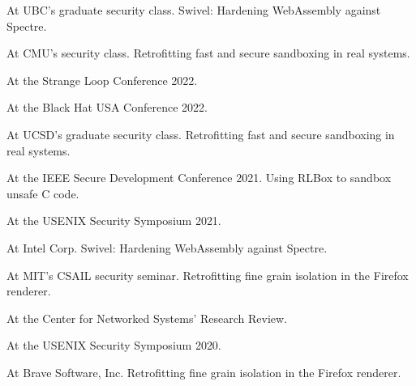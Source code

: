 { At UBC's graduate security class. Swivel: Hardening WebAssembly against
Spectre. }

{ At CMU's security class. Retrofitting fast and secure sandboxing in real
systems. }

{ At the Strange Loop Conference 2022.
}

{ At the Black Hat USA Conference 2022.
}

{ At UCSD's graduate security class. Retrofitting fast and secure sandboxing in
real systems. }

{ At the IEEE Secure Development Conference 2021. Using RLBox to sandbox unsafe C
code. }

{ At the USENIX Security Symposium 2021.
}

{ At Intel Corp. Swivel: Hardening WebAssembly against Spectre. }

{ At MIT's CSAIL security seminar. Retrofitting fine grain isolation in the
Firefox renderer. }

{ At the Center for Networked Systems' Research Review.
}

{ At the USENIX Security Symposium 2020.
}

{ At Brave Software, Inc. Retrofitting fine grain isolation in the Firefox
renderer. }
